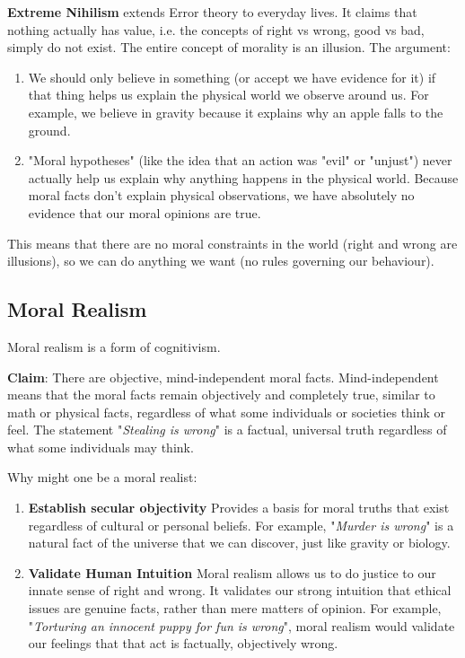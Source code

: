 \documentclass[12pt]{article}
\begin{document}
\textbf{Extreme Nihilism} extends Error theory to everyday lives. It claims that nothing actually has value, i.e. the concepts of right vs wrong,
good vs bad, simply do not exist. The entire concept of morality is an illusion.
The argument:
\begin{enumerate}
    \item We should only believe in something (or accept we have evidence for it) if that thing helps us explain the physical world we observe around us.
    For example, we believe in gravity because it explains why an apple falls to the ground.
    \item "Moral hypotheses" (like the idea that an action was "evil" or "unjust") never actually help us explain why anything happens in the physical world. 
    Because moral facts don't explain physical observations, we have absolutely no evidence that our moral opinions are true.
\end{enumerate}
This means that there are no moral constraints in the world (right and wrong are illusions), so we can do anything we want (no rules governing our behaviour).

\subsection{Moral Realism}
Moral realism is a form of cognitivism.

\noindent \textbf{Claim}: There are objective, mind-independent moral facts.
Mind-independent means that the moral facts remain objectively and completely true, similar to math or physical facts,
regardless of what some individuals or societies think or feel.
The statement "\textit{Stealing is wrong}" is a factual, universal truth regardless of what some individuals may think.

\noindent Why might one be a moral realist:
\begin{enumerate}
    \item \textbf{Establish secular objectivity} Provides a basis for moral truths that exist regardless of cultural or personal beliefs.
    For example, "\textit{Murder is wrong}" is a natural fact of the universe that we can discover, just like gravity or biology.
    \item \textbf{Validate Human Intuition} Moral realism allows us to do justice to our innate sense of right and wrong.
    It validates our strong intuition that ethical issues are genuine facts, rather than mere matters of opinion.
    For example, "\textit{Torturing an innocent puppy for fun is wrong}", moral realism would validate our feelings that that act is factually, objectively wrong.
\end{enumerate}
\end{document}
